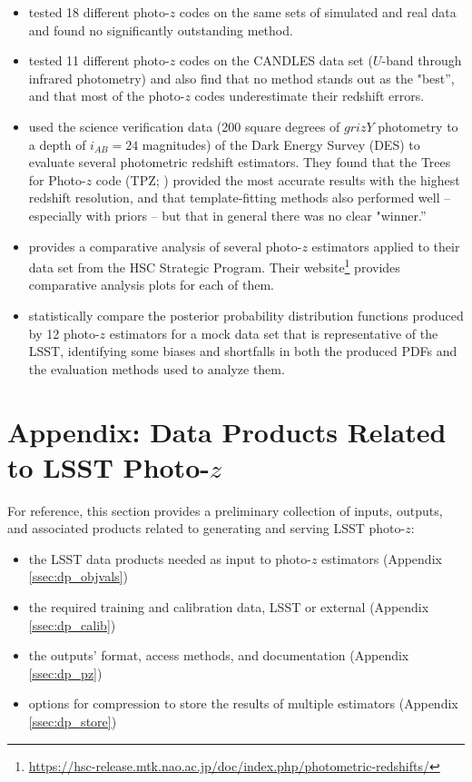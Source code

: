 \documentclass[DM,lsstdraft,toc]{lsstdoc}
\begin{document}
\begin{itemize}
\item \citet{2010A&A...523A..31H} tested 18 different photo-$z$ codes on the same sets of simulated and real data and found no significantly outstanding method.
\item \citet{2013ApJ...775...93D} tested 11 different photo-$z$ codes on the CANDLES data set ($U$-band through infrared photometry) and also find that no method stands out as the "best'', and that most of the photo-$z$ codes underestimate their redshift errors.
\item \citet{2014MNRAS.445.1482S} used the science verification data (200 square degrees of $grizY$ photometry to a depth of $i_{AB}=24$ magnitudes) of the Dark Energy Survey (DES) to evaluate several photometric redshift estimators. They found that the Trees for Photo-$z$ code (TPZ; \citet{2013ascl.soft04011C}) provided the most accurate results with the highest redshift resolution, and that template-fitting methods also performed well -- especially with priors -- but that in general there was no clear "winner.''
\item \citet{2018PASJ...70S...9T} provides a comparative analysis of several photo-$z$ estimators applied to their data set from the HSC Strategic Program. Their website\footnote{\url{https://hsc-release.mtk.nao.ac.jp/doc/index.php/photometric-redshifts/}} provides comparative analysis plots for each of them.
\item \citet{2020arXiv200103621S} statistically compare the posterior probability distribution functions produced by 12 photo-$z$ estimators for a mock data set that is representative of the LSST, identifying some biases and shortfalls in both the produced PDFs and the evaluation methods used to analyze them.
\end{itemize}



\clearpage
\section{Appendix: Data Products Related to LSST Photo-$z$}\label{sec:dp}

For reference, this section provides a preliminary collection of inputs, outputs, and associated products related to generating and serving LSST photo-$z$:
\begin{itemize}
\item the LSST data products needed as input to photo-$z$ estimators (Appendix \ref{ssec:dp_objvals})
\item the required training and calibration data, LSST or external (Appendix \ref{ssec:dp_calib})
\item the outputs' format, access methods, and documentation (Appendix \ref{ssec:dp_pz})
\item options for compression to store the results of multiple estimators (Appendix \ref{ssec:dp_store})
\end{itemize}
\end{document}
